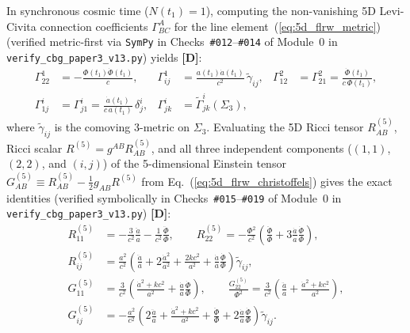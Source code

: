 \documentclass[11pt,a4paper]{article}
\newcommand{\catD}{\textbf{\textcolor{blue!75!black}{[D]}}}
\theoremstyle{plain}
\theoremstyle{definition}
\theoremstyle{remark}
\numberwithin{equation}{section}
\begin{document}
In synchronous cosmic time ($N(t_1) = 1$), computing the non-vanishing 5D Levi-Civita connection coefficients $\Gamma^A_{BC}$ for the line element~(\ref{eq:5d_flrw_metric}) (verified metric-first via \texttt{SymPy} in Checks~\texttt{\#012}--\texttt{\#014} of Module~0 in \allowbreak\texttt{verify\_cbg\_paper3\_v13.py}) yields \catD:
\begin{align}
\Gamma^1_{22} &= -\frac{\Phi(t_1)\dot{\Phi}(t_1)}{c}, & \Gamma^1_{ij} &= \frac{a(t_1)\dot{a}(t_1)}{c^2}\,\tilde{\gamma}_{ij}, & \Gamma^2_{12} &= \Gamma^2_{21} = \frac{\dot{\Phi}(t_1)}{c\,\Phi(t_1)}, \nonumber\\[4pt]
\Gamma^i_{1j} &= \Gamma^i_{j1} = \frac{\dot{a}(t_1)}{c\,a(t_1)}\,\delta^i_j, & \Gamma^i_{jk} &= \tilde{\Gamma}^i_{jk}(\Sigma_3), & &
\label{eq:5d_flrw_christoffels}
\end{align}
where $\tilde{\gamma}_{ij}$ is the comoving 3-metric on $\Sigma_3$. Evaluating the 5D Ricci tensor $R_{AB}^{(5)}$, Ricci scalar $R^{(5)} = g^{AB} R_{AB}^{(5)}$, and all three independent components ($(1,1)$, $(2,2)$, and $(i,j)$) of the 5-dimensional Einstein tensor $G_{AB}^{(5)} \equiv R_{AB}^{(5)} - \frac{1}{2}g_{AB} R^{(5)}$ from Eq.~(\ref{eq:5d_flrw_christoffels}) gives the exact identities (verified symbolically in Checks~\texttt{\#015}--\texttt{\#019} of Module~0 in \allowbreak\texttt{verify\_cbg\_paper3\_v13.py}) \catD:
\begin{align}
R_{11}^{(5)} &= -\frac{3}{c^2}\frac{\ddot{a}}{a} - \frac{1}{c^2}\frac{\ddot{\Phi}}{\Phi}, \qquad R_{22}^{(5)} = -\frac{\Phi^2}{c^2}\left( \frac{\ddot{\Phi}}{\Phi} + 3\frac{\dot{a}}{a}\frac{\dot{\Phi}}{\Phi} \right), \label{eq:ricci_5d_11_22} \\[4pt]
R_{ij}^{(5)} &= \frac{a^2}{c^2} \left( \frac{\ddot{a}}{a} + 2\frac{\dot{a}^2}{a^2} + \frac{2 k c^2}{a^2} + \frac{\dot{a}}{a}\frac{\dot{\Phi}}{\Phi} \right) \tilde{\gamma}_{ij}, \label{eq:ricci_5d_ij} \\[4pt]
G_{11}^{(5)} &= \frac{3}{c^2}\left( \frac{\dot{a}^2 + k c^2}{a^2} + \frac{\dot{a}}{a}\frac{\dot{\Phi}}{\Phi} \right), \qquad \frac{G_{22}^{(5)}}{\Phi^2} = \frac{3}{c^2}\left( \frac{\ddot{a}}{a} + \frac{\dot{a}^2 + k c^2}{a^2} \right), \label{eq:einstein_5d_11} \\[4pt]
G_{ij}^{(5)} &= -\frac{a^2}{c^2}\left( 2\frac{\ddot{a}}{a} + \frac{\dot{a}^2 + k c^2}{a^2} + \frac{\ddot{\Phi}}{\Phi} + 2\frac{\dot{a}}{a}\frac{\dot{\Phi}}{\Phi} \right) \tilde{\gamma}_{ij}.
\label{eq:einstein_5d_ij}
\end{align}
\end{document}
